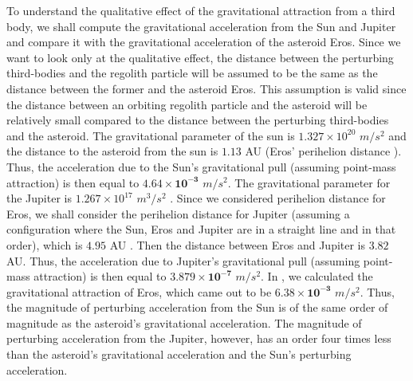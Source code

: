 To understand the qualitative effect of the gravitational attraction from a third body, we shall compute the gravitational acceleration from the Sun and Jupiter and compare it with the gravitational acceleration of the asteroid Eros. Since we want to look only at the qualitative effect, the distance between the perturbing third-bodies and the regolith particle will be assumed to be the same as the distance between the former and the asteroid Eros. This assumption is valid since the distance between an orbiting regolith particle and the asteroid will be relatively small compared to the distance between the perturbing third-bodies and the asteroid. The gravitational parameter of the sun is $1.327 \times 10^{20}$ $m/s^2$ \cite{mu_sun} and the distance to the asteroid from the sun is $1.13$ AU \cite{scheeres_srp_regolith} (Eros' perihelion distance \cite{eros_data}). Thus, the acceleration due to the Sun's gravitational pull (assuming point-mass attraction) is then equal to $\mathbf{4.64 \times 10^{-3}}$ $m/s^2$. The gravitational parameter for the Jupiter is $1.267 \times 10^{17}$ $m^3/s^2$ \cite{mu_jupiter}. Since we considered perihelion distance for Eros, we shall consider the perihelion distance for Jupiter (assuming a configuration where the Sun, Eros and Jupiter are in a straight line and in that order), which is $4.95$ AU \cite{mu_jupiter}. Then the distance between Eros and Jupiter is $3.82$ AU. Thus, the acceleration due to Jupiter's gravitational pull (assuming point-mass attraction) is then equal to $\mathbf{3.879 \times 10^{-7}}$ $m/s^2$. In , we calculated the gravitational attraction of Eros, which came out to be $\mathbf{6.38 \times 10^{-3}}$ $m/s^2$. Thus, the magnitude of perturbing acceleration from the Sun is of the same order of magnitude as the asteroid's gravitational acceleration. The magnitude of perturbing acceleration from the Jupiter, however, has an order four times less than the asteroid's gravitational acceleration and the Sun's perturbing acceleration.

